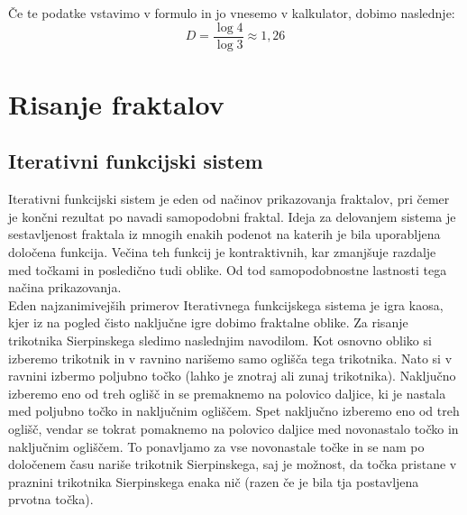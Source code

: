 \documentclass[a4paper, 12px]{article}
\begin{document}
        \addvspace{0.5cm}
        Če te podatke vstavimo v formulo in jo vnesemo v kalkulator, dobimo naslednje:
        \[D=\frac{\log{4}}{\log{3}}\approx1,26\]

\section{Risanje fraktalov}
    \subsection{Iterativni funkcijski sistem}
        Iterativni funkcijski sistem je eden od načinov prikazovanja fraktalov, pri čemer je končni rezultat po navadi samopodobni fraktal.
        Ideja za delovanjem sistema je sestavljenost fraktala iz mnogih enakih podenot na katerih je bila uporabljena določena funkcija.
        Večina teh funkcij je kontraktivnih, kar zmanjšuje razdalje med točkami in posledično tudi oblike.
        Od tod samopodobnostne lastnosti tega načina prikazovanja.
        \cite{IFS}\\

        Eden najzanimivejših primerov Iterativnega funkcijskega sistema je igra kaosa, kjer iz na pogled čisto naključne igre dobimo fraktalne oblike.
        Za risanje trikotnika Sierpinskega sledimo naslednjim navodilom.
        Kot osnovno obliko si izberemo trikotnik in v ravnino narišemo samo oglišča tega trikotnika.
        Nato si v ravnini izbermo poljubno točko (lahko je znotraj ali zunaj trikotnika).
        Naključno izberemo eno od treh oglišč in se premaknemo na polovico daljice, ki je nastala med poljubno točko in naključnim ogliščem.
        Spet naključno izberemo eno od treh oglišč, vendar se tokrat pomaknemo na polovico daljice med novonastalo točko in naključnim ogliščem.
        To ponavljamo za vse novonastale točke in se nam po določenem času nariše trikotnik Sierpinskega, saj je možnost, da točka pristane v praznini trikotnika Sierpinskega enaka nič (razen če je bila tja postavljena prvotna točka).
        \cite{ChaosGame}\\
\end{document}
